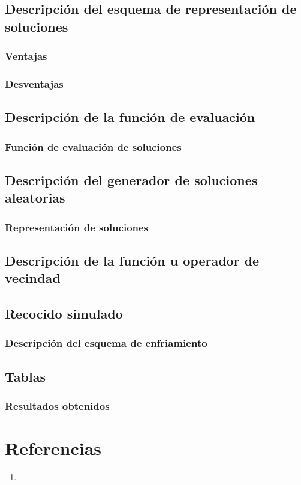 \documentclass{article}
\begin{document}
\subsection*{Descripción del esquema de representación de soluciones}

\subsubsection*{Ventajas}

\subsubsection*{Desventajas}

\subsection*{Descripción de la función de evaluación}

\subsubsection*{Función de evaluación de soluciones}

\subsection*{Descripción del generador de soluciones aleatorias}

\subsubsection*{Representación de soluciones}

\subsection*{Descripción de la función u operador de vecindad}

\subsection*{Recocido simulado}

\subsubsection*{Descripción del esquema de enfriamiento}

\subsection*{Tablas}

\subsubsection*{Resultados obtenidos}

\newpage
\section*{Referencias}
\begin{enumerate}
	\item 
\end{enumerate}
\end{document}
